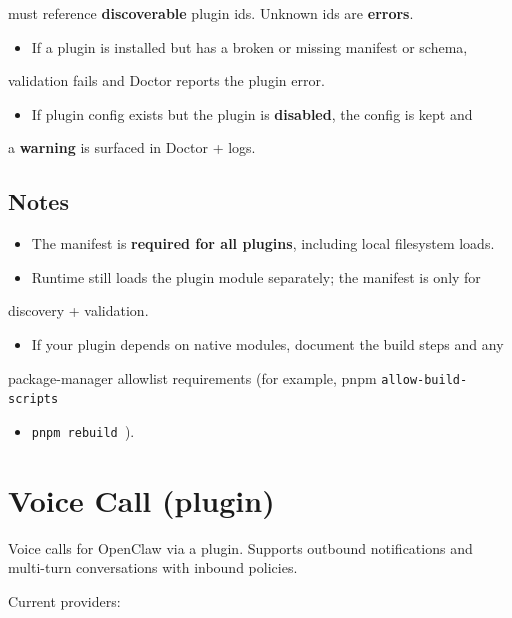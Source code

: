 must reference \textbf{discoverable} plugin ids. Unknown ids are \textbf{errors}.
\begin{itemize}
  \item If a plugin is installed but has a broken or missing manifest or schema,
\end{itemize}

validation fails and Doctor reports the plugin error.
\begin{itemize}
  \item If plugin config exists but the plugin is \textbf{disabled}, the config is kept and
\end{itemize}

a \textbf{warning} is surfaced in Doctor + logs.

\subsection{Notes}


\begin{itemize}
  \item The manifest is \textbf{required for all plugins}, including local filesystem loads.
  \item Runtime still loads the plugin module separately; the manifest is only for
\end{itemize}

discovery + validation.
\begin{itemize}
  \item If your plugin depends on native modules, document the build steps and any
\end{itemize}

package-manager allowlist requirements (for example, pnpm \texttt{allow-build-scripts}
\begin{itemize}
  \item \texttt{pnpm rebuild }).
\end{itemize}



\clearpage

\section{Voice Call (plugin)}


Voice calls for OpenClaw via a plugin. Supports outbound notifications and
multi-turn conversations with inbound policies.

Current providers:

